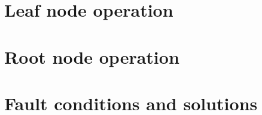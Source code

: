 \section{Leaf node operation}

\section{Root node operation}

\section{Fault conditions and solutions}

